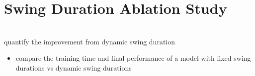 \section{Swing Duration Ablation Study}
\label{sec:results-swing-ablation-study}

\begin{todo}\\
  quantify the improvement from dynamic swing duration
  \begin{itemize}
    \item compare the training time and final performance of a model
      with fixed swing durations vs dynamic swing durations
  \end{itemize}
\end{todo}
